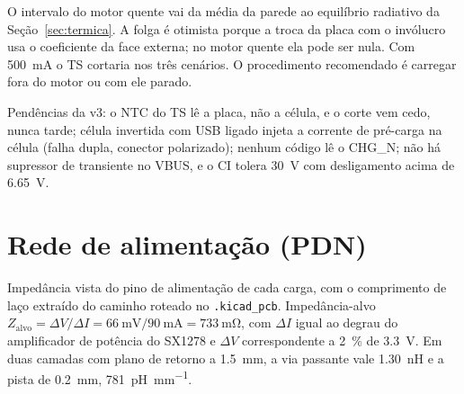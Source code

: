 \documentclass[10pt,a4paper,landscape]{article}
\begin{document}
O intervalo do motor quente vai da média da parede ao equilíbrio radiativo da Seção~\ref{sec:termica}. A folga é otimista porque a troca da placa com o invólucro usa o coeficiente da face externa; no motor quente ela pode ser nula. Com \SI{500}{\milli\ampere} o TS cortaria nos três cenários. O procedimento recomendado é carregar fora do motor ou com ele parado.

Pendências da v3: o NTC do TS lê a placa, não a célula, e o corte vem cedo, nunca tarde; célula invertida com USB ligado injeta a corrente de pré-carga na célula (falha dupla, conector polarizado); nenhum código lê o CHG\_N; não há supressor de transiente no VBUS, e o CI tolera \SI{30}{\volt} com desligamento acima de \SI{6.65}{\volt}.

\section{Rede de alimentação (PDN)}

Impedância vista do pino de alimentação de cada carga, com o comprimento de laço extraído do caminho roteado no \texttt{.kicad\_pcb}. Impedância-alvo $Z_\text{alvo} = \Delta V/\Delta I = \SI{66}{\milli\volt}/\SI{90}{\milli\ampere} = \SI{733}{\milli\ohm}$, com $\Delta I$ igual ao degrau do amplificador de potência do SX1278 e $\Delta V$ correspondente a \SI{2}{\percent} de \SI{3.3}{\volt}. Em duas camadas com plano de retorno a \SI{1.5}{\milli\meter}, a via passante vale \SI{1.30}{\nano\henry} e a pista de \SI{0.2}{\milli\meter}, \SI{781}{\pico\henry\per\milli\meter}.
\end{document}
